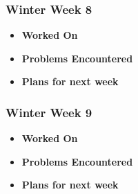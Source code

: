 \documentclass[compsoc,draftclsnofoot,onecolumn,10pt]{IEEEtran}
\begin{document}
\subsubsection{Winter Week 8}
\begin{itemize}
    \item {\textbf{Worked On}}
    \begin{itemize}

    \end{itemize}

    \item {\textbf{Problems Encountered}}
    \begin{itemize}

    \end{itemize}

    \item{\textbf{Plans for next week}}
    \begin{itemize}

    \end{itemize}

\end{itemize}

\subsubsection{Winter Week 9}
\begin{itemize}
    \item {\textbf{Worked On}}
    \begin{itemize}

    \end{itemize}

    \item {\textbf{Problems Encountered}}
    \begin{itemize}

    \end{itemize}

    \item{\textbf{Plans for next week}}
    \begin{itemize}

    \end{itemize}

\end{itemize}
\end{document}
